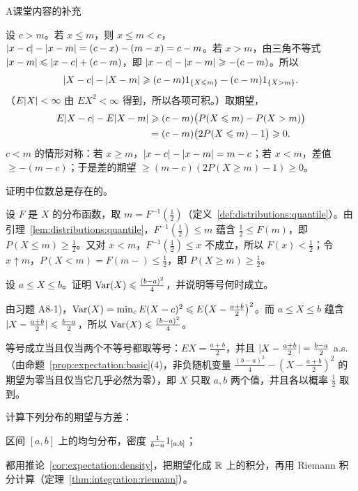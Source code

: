 \begin{exercises}{A}{课堂内容的补充}
\begin{questions}
\begin{solution}
设 $c>m$。若 $x\leqslant m$，则 $x\leqslant m<c$，$\lvert x-c\rvert-\lvert x-m\rvert=(c-x)-(m-x)=c-m$。若 $x>m$，由三角不等式 $\lvert x-m\rvert\leqslant\lvert x-c\rvert+(c-m)$，即 $\lvert x-c\rvert-\lvert x-m\rvert\geqslant-(c-m)$。所以
\[
\lvert X-c\rvert-\lvert X-m\rvert\geqslant(c-m)1_{\{X\leqslant m\}}-(c-m)1_{\{X>m\}}.
\]
（$E\lvert X\rvert<\infty$ 由 $EX^2<\infty$ 得到，所以各项可积。）取期望，
\[
\begin{aligned}
E\lvert X-c\rvert-E\lvert X-m\rvert&\geqslant(c-m)\bigl(P(X\leqslant m)-P(X>m)\bigr)\\
&=(c-m)\bigl(2P(X\leqslant m)-1\bigr)\geqslant0 .
\end{aligned}
\]
$c<m$ 的情形对称：若 $x\geqslant m$，$\lvert x-c\rvert-\lvert x-m\rvert=m-c$；若 $x<m$，差值 $\geqslant-(m-c)$；于是差的期望 $\geqslant(m-c)(2P(X\geqslant m)-1)\geqslant0$。
\end{solution}
\item 证明中位数总是存在的。
\begin{solution}
设 $F$ 是 $X$ 的分布函数，取 $m=F^{-1}(\frac12)$（定义~\ref{def:distributions:quantile}）。由引理~\ref{lem:distributions:quantile}，$F^{-1}(\frac12)\leqslant m$ 蕴含 $\frac12\leqslant F(m)$，即 $P(X\leqslant m)\geqslant\frac12$。又对 $x<m$，$F^{-1}(\frac12)\leqslant x$ 不成立，所以 $F(x)<\frac12$；令 $x\uparrow m$，$P(X<m)=F(m-)\leqslant\frac12$，即 $P(X\geqslant m)\geqslant\frac12$。
\end{solution}
\end{questions}

\item\label{ex:expectation:A9} 设 $a\leqslant X\leqslant b$。证明 $\operatorname{Var}(X)\leqslant\frac{(b-a)^2}4$，并说明等号何时成立。
\begin{solution}
由习题 A8-1)，$\operatorname{Var}(X)=\min_cE(X-c)^2\leqslant E\bigl(X-\frac{a+b}2\bigr)^2$。而 $a\leqslant X\leqslant b$ 蕴含 $\lvert X-\frac{a+b}2\rvert\leqslant\frac{b-a}2$，所以 $\operatorname{Var}(X)\leqslant\frac{(b-a)^2}4$。

等号成立当且仅当两个不等号都取等号：$EX=\frac{a+b}2$，并且 $\lvert X-\frac{a+b}2\rvert=\frac{b-a}2$ a.s.（由命题~\ref{prop:expectation:basic}(4)，非负随机变量 $\frac{(b-a)^2}4-(X-\frac{a+b}2)^2$ 的期望为零当且仅当它几乎必然为零），即 $X$ 只取 $a,b$ 两个值，并且各以概率 $\frac12$ 取到。
\end{solution}

\item\label{ex:expectation:A10} 计算下列分布的期望与方差：
\begin{questions}
\item 区间 $[a,b]$ 上的均匀分布，密度 $\frac1{b-a}1_{[a,b]}$；
\begin{solution}
都用推论~\ref{cor:expectation:density}，把期望化成 $\mathbb{R}$ 上的积分，再用 Riemann 积分计算（定理~\ref{thm:integration:riemann}）。


\end{solution}
\end{questions}
\end{exercises}
